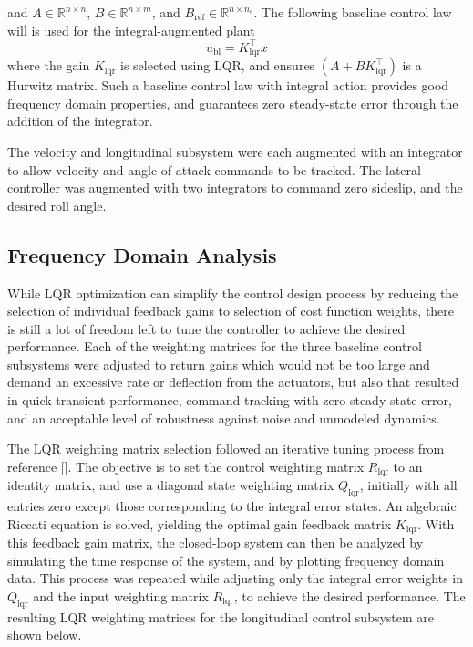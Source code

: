 \documentclass[]{../sty/aiaa-tc}
\begin{document}
  and $A\in\mathbb{R}^{n\times n}$, $B\in\mathbb{R}^{n\times m}$, and $B_{\text{ref}}\in\mathbb{R}^{n\times n_{e}}$.
  The following baseline control law will is used for the integral-augmented plant
  \begin{equation}
    \label{eqn:lqrpilaw}
    u_{\text{bl}}=K_{\text{lqr}}^{\top}x
  \end{equation}
  where the gain $K_{\text{lqr}}$ is selected using LQR, and ensures $(A+BK_{\text{lqr}}^{\top})$ is a Hurwitz matrix.
  Such a baseline control law with integral action provides good frequency domain properties, and guarantees zero steady-state error through the addition of the integrator.

  The velocity and longitudinal subsystem were each augmented with an integrator to allow velocity and angle of attack commands to be tracked.
  The lateral controller was augmented with two integrators to command zero sideslip, and the desired roll angle.

  \subsection{Frequency Domain Analysis}

  While LQR optimization can simplify the control design process by reducing the selection of individual feedback gains to selection of cost function weights, there is still a lot of freedom left to tune the controller to achieve the desired performance.
  Each of the weighting matrices for the three baseline control subsystems were adjusted to return gains which would not be too large and demand an excessive rate or deflection from the actuators, but also that resulted in quick transient performance, command tracking with zero steady state error, and an acceptable level of robustness against noise and unmodeled dynamics.

  The LQR weighting matrix selection followed an iterative tuning process from reference [].
  The objective is to set the control weighting matrix $R_{\text{lqr}}$ to an identity matrix, and use a diagonal state weighting matrix $Q_{\text{lqr}}$, initially with all entries zero except those corresponding to the integral error states.
  An algebraic Riccati equation is solved, yielding the optimal gain feedback matrix $K_{\text{lqr}}$.
  With this feedback gain matrix, the closed-loop system can then be analyzed by simulating the time response of the system, and by plotting frequency domain data.
  This process was repeated while adjusting only the integral error weights in $Q_{\text{lqr}}$ and the input weighting matrix $R_{\text{lqr}}$, to achieve the desired performance.
  The resulting LQR weighting matrices for the longitudinal control subsystem are shown below.
\end{document}
